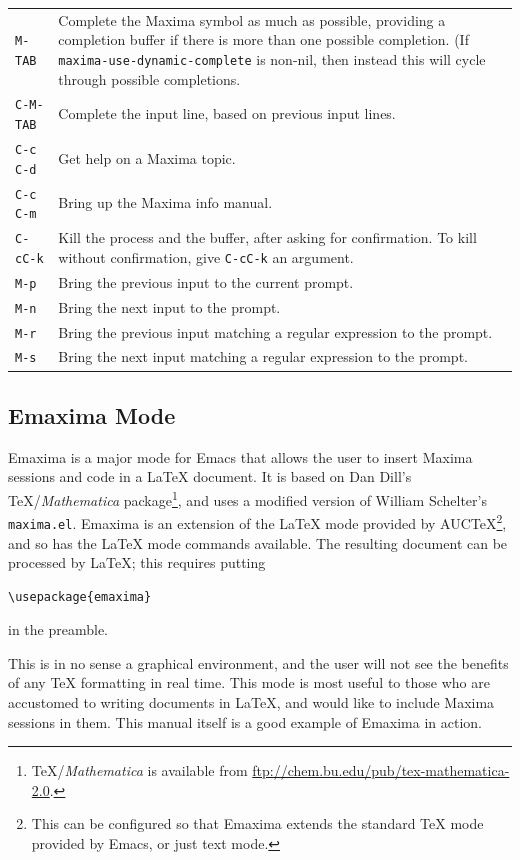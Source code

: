 \begin{tabular}{p{\firstcol}p{\secondcol}}
\texttt{M-TAB} & Complete the Maxima symbol as much as possible, providing
     a completion buffer if there is more than one possible
     completion.
     (If \texttt{maxima-use-dynamic-complete} is non-nil, then instead
     this will cycle through possible completions.\\
\texttt{C-M-TAB} & Complete the input line, based on previous input lines.\\
\texttt{C-c C-d} & Get help on a Maxima topic.\\
\texttt{C-c C-m} & Bring up the Maxima info manual.\\
\texttt{C-cC-k} & Kill the process and the buffer, after asking for
  confirmation.  To kill without confirmation, give \texttt{C-cC-k} an
  argument.\\
\texttt{M-p} & Bring the previous input to the current prompt.\\
\texttt{M-n} & Bring the next input to the prompt.\\
\texttt{M-r} & Bring the previous input matching
  a regular expression to the prompt.\\
\texttt{M-s} & Bring the next input matching
  a regular expression to the prompt.
\end{tabular}


\subsection{Emaxima Mode}

Emaxima is a major mode for Emacs that allows the user to insert Maxima
sessions and code in a \LaTeX{} document.  It is based on Dan Dill's
\TeX{}/\textit{Mathematica} package\footnote{\TeX/\textit{Mathematica} is
available from \url{ftp://chem.bu.edu/pub/tex-mathematica-2.0}.}, and
uses a modified version of William Schelter's \texttt{maxima.el}.
Emaxima is an extension of the
\LaTeX{} mode provided by AUC\TeX{}\footnote{This can be configured so
that Emaxima extends the standard \TeX{} mode provided by Emacs, or just
text mode.}, and so has the \LaTeX{} mode commands available.  The
resulting document can be processed by \LaTeX{}; this requires putting 
\begin{verbatim}
\usepackage{emaxima}
\end{verbatim}
\noindent
in the preamble.

This is in no sense a graphical environment, and the user will not see
the benefits of any TeX formatting in real time.  This mode is most 
useful to those who are accustomed to writing documents in LaTeX,
and would like to include Maxima sessions in them.  This manual itself
is a good example of Emaxima in action.

